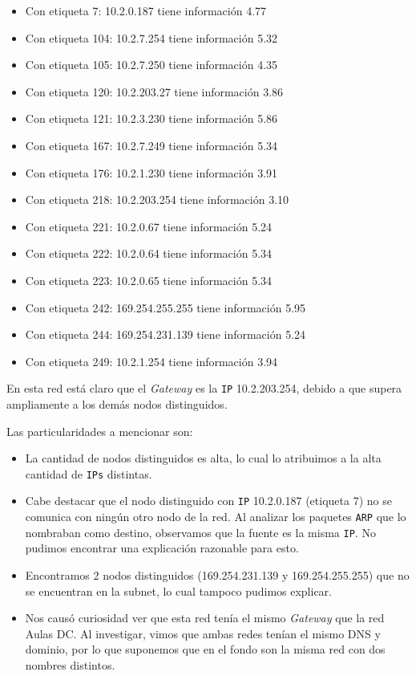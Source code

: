 \begin{itemize}
    \item Con etiqueta 7: 10.2.0.187 tiene información 4.77
    \item Con etiqueta 104: 10.2.7.254 tiene información 5.32
    \item Con etiqueta 105: 10.2.7.250 tiene información 4.35
    \item Con etiqueta 120: 10.2.203.27 tiene información 3.86
    \item Con etiqueta 121: 10.2.3.230 tiene información 5.86
    \item Con etiqueta 167: 10.2.7.249 tiene información 5.34
    \item Con etiqueta 176: 10.2.1.230 tiene información 3.91
    \item Con etiqueta 218: 10.2.203.254 tiene información 3.10
    \item Con etiqueta 221: 10.2.0.67 tiene información 5.24
    \item Con etiqueta 222: 10.2.0.64 tiene información 5.34
    \item Con etiqueta 223: 10.2.0.65 tiene información 5.34
    \item Con etiqueta 242: 169.254.255.255 tiene información 5.95
    \item Con etiqueta 244: 169.254.231.139 tiene información 5.24
    \item Con etiqueta 249: 10.2.1.254 tiene información 3.94
    
\end{itemize}

En esta red está claro que el \textit{Gateway} es la \texttt{IP} 10.2.203.254, debido a que
supera ampliamente a los demás nodos distinguidos.

Las particularidades a mencionar son:
\begin{itemize}
    \item La cantidad de nodos distinguidos es alta, lo cual lo atribuimos a la alta
        cantidad de \texttt{IPs} distintas.
    \item Cabe destacar que el nodo distinguido con \texttt{IP} 10.2.0.187 (etiqueta 7)
        no se comunica con ningún otro nodo de la red. Al analizar los paquetes \texttt{ARP} que lo nombraban como
        destino, observamos que la fuente es la misma \texttt{IP}. No pudimos encontrar una explicación razonable para
        esto.
    \item Encontramos 2 nodos distinguidos (169.254.231.139 y 169.254.255.255) que no
        se encuentran en la subnet, lo cual tampoco pudimos explicar.
    \item Nos causó curiosidad ver que esta red tenía el mismo \textit{Gateway} que la red
        Aulas DC. Al investigar, vimos que ambas redes tenían el mismo DNS y dominio, por lo que suponemos
        que en el fondo son la misma red con dos nombres distintos.
\end{itemize}

